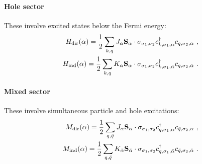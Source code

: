 \documentclass[%
reprint,
superscriptaddress,
groupedaddress,
superscriptaddress,
onecolumn,
10pt
]{revtex4-2}
\begin{document}
\paragraph{Hole sector}
These involve excited states below the Fermi energy:
\begin{equation}\begin{aligned}
	H_\text{dir}(\alpha) = \frac{1}{2}\sum_{k, q} J_\alpha {\bf S}_\alpha \cdot {\bf \sigma}_{\sigma_1,\sigma_2} c^\dagger_{k,\sigma_1, \alpha}c_{q,\sigma_2, \alpha}~,\\
	H_\text{ind}(\alpha) = \frac{1}{2}\sum_{k, q} K_{\alpha} {\bf S}_{\alpha} \cdot {\bf \sigma}_{\sigma_1,\sigma_2} c^\dagger_{k,\sigma_1, \bar\alpha}c_{q,\sigma_2, \bar\alpha}~.
\end{aligned}\end{equation}
\paragraph{Mixed sector}
These involve simultaneous particle and hole excitations:
\begin{equation}\begin{aligned}
	M_\text{dir}(\alpha) = \frac{1}{2}\sum_{q, \bar q} J_\alpha {\bf S}_\alpha \cdot {\bf \sigma}_{\sigma_1,\sigma_2} c^\dagger_{q,\sigma_1, \alpha}c_{\bar q,\sigma_2, \alpha}~,\\
	M_\text{ind}(\alpha) = \frac{1}{2}\sum_{q, \bar q} K_{\bar\alpha} {\bf S}_{\bar\alpha} \cdot {\bf \sigma}_{\sigma_1,\sigma_2} c^\dagger_{q,\sigma_1, \bar\alpha}c_{\bar q,\sigma_2, \bar\alpha}~.
\end{aligned}\end{equation}
\end{document}
